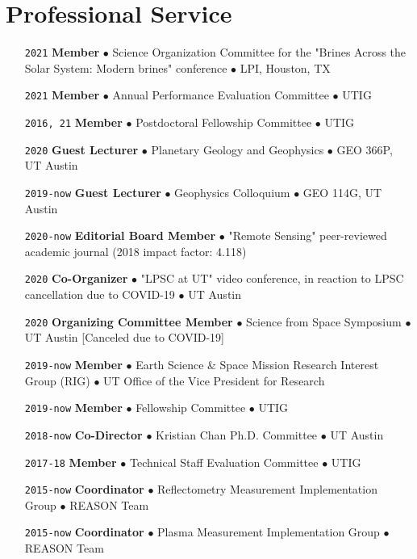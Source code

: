 \section*{Professional Service}

\begin{itemize}[leftmargin=5.8em, labelsep=1.5em]
    \setlength\itemsep{-.5em}
    \item[\texttt{2021}] \textbf{Member} $\bullet$ Science Organization Committee for the "Brines Across the Solar System: Modern brines" conference $\bullet$ LPI, Houston, TX
    \item[\texttt{2021}] \textbf{Member} $\bullet$ Annual Performance Evaluation Committee $\bullet$ UTIG
    \item[\texttt{2016, 21}] \textbf{Member} $\bullet$ Postdoctoral Fellowship Committee $\bullet$ UTIG
    \item[\texttt{2020}] \textbf{Guest Lecturer} $\bullet$ Planetary Geology and Geophysics $\bullet$  GEO 366P, UT Austin 
    \item[\texttt{2019-now}] \textbf{Guest Lecturer} $\bullet$ Geophysics Colloquium $\bullet$  GEO 114G, UT Austin
    \item[\texttt{2020-now}] \textbf{Editorial Board Member} $\bullet$ "Remote Sensing" peer-reviewed academic journal (2018 impact factor: 4.118)
    \item[\texttt{2020}] \textbf{Co-Organizer} $\bullet$ "LPSC at UT" video conference, in reaction to LPSC cancellation due to COVID-19 $\bullet$ UT Austin
    \item[\texttt{2020}] \textbf{Organizing Committee Member} $\bullet$ Science from Space Symposium $\bullet$ UT Austin [Canceled due to COVID-19]
    \item[\texttt{2019-now}] \textbf{Member} $\bullet$ Earth Science \& Space Mission Research Interest Group (RIG) $\bullet$ UT Office of the Vice President for Research
    \item[\texttt{2019-now}] \textbf{Member} $\bullet$ Fellowship Committee $\bullet$ UTIG
    \item[\texttt{2018-now}] \textbf{Co-Director} $\bullet$ Kristian Chan Ph.D. Committee $\bullet$ UT Austin
    \item[\texttt{2017-18}] \textbf{Member} $\bullet$ Technical Staff Evaluation Committee $\bullet$ UTIG
    \item[\texttt{2015-now}] \textbf{Coordinator} $\bullet$ Reflectometry Measurement Implementation Group $\bullet$ REASON Team
    \item[\texttt{2015-now}] \textbf{Coordinator} $\bullet$ Plasma Measurement Implementation Group $\bullet$ REASON Team

\end{itemize}
